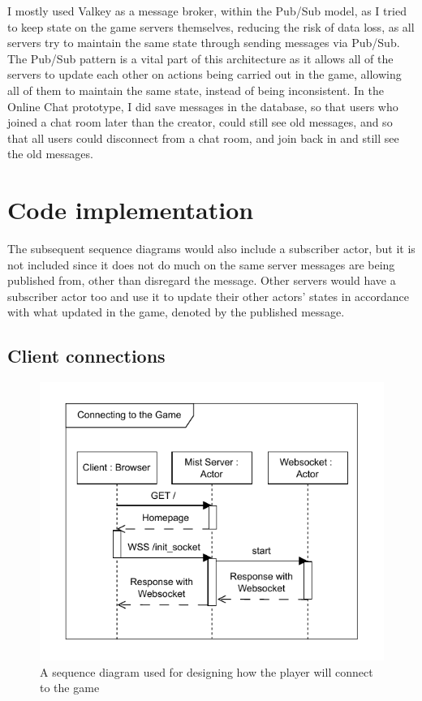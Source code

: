 \documentclass[]{final}
\begin{document}
\label{valkeyMessageBroker}

I mostly used Valkey as a message broker, within the Pub/Sub model, as I
tried to keep state on the game servers themselves, reducing the risk of data
loss, as all servers try to maintain the same state through sending messages
via Pub/Sub. The Pub/Sub pattern is a vital part of this architecture as it
allows all of the servers to update each other on actions being carried out
in the game, allowing all of them to maintain the same state,
instead of being inconsistent. In the Online Chat prototype,
I did save messages in the database, so that users who joined
a chat room later than the creator, could still see old messages, and so that all
users could disconnect from a chat room, and join back in and still see the old
messages.

\section{Code implementation}

The subsequent sequence diagrams would also include a subscriber actor,
but it is not included since it does not do much on the same server
messages are being published from, other than disregard the message.
Other servers would have a subscriber actor too and use it to update
their other actors' states in accordance with what updated in the game,
denoted by the published message.

\subsection{Client connections}

\begin{figure}[H]
  \centering
  \includegraphics[width=.5\textwidth]{sequence_connecting}
  \caption{A sequence diagram used for designing how the player will connect to the game}\label{fig: clientConn}
\end{figure}
\end{document}

